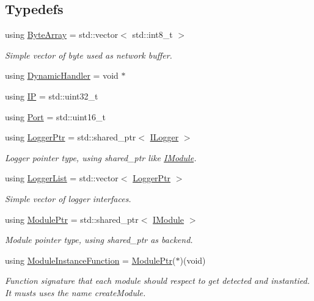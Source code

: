 \subsection*{Typedefs}
\begin{DoxyCompactItemize}
\item 
using \mbox{\hyperlink{namespaceo_z_abfa3f5a46e5c7584615dc1dd33fcafb6}{Byte\+Array}} = std\+::vector$<$ std\+::int8\+\_\+t $>$
\begin{DoxyCompactList}\small\item\em Simple vector of byte used as network buffer. \end{DoxyCompactList}\item 
using \mbox{\hyperlink{namespaceo_z_acbfabf71824b5fc6a3beb64e397afc19}{Dynamic\+Handler}} = void $\ast$
\item 
using \mbox{\hyperlink{namespaceo_z_ace55c2d0182a14ceea9649d0d0cf9c4a}{IP}} = std\+::uint32\+\_\+t
\item 
using \mbox{\hyperlink{namespaceo_z_afeccb82d451972ba3b7d2a32b066b30b}{Port}} = std\+::uint16\+\_\+t
\item 
using \mbox{\hyperlink{namespaceo_z_aaa2fbabbfafc6616a7e69651b62a3d4e}{Logger\+Ptr}} = std\+::shared\+\_\+ptr$<$ \mbox{\hyperlink{classo_z_1_1_i_logger}{I\+Logger}} $>$
\begin{DoxyCompactList}\small\item\em Logger pointer type, using shared\+\_\+ptr like \mbox{\hyperlink{classo_z_1_1_i_module}{I\+Module}}. \end{DoxyCompactList}\item 
using \mbox{\hyperlink{namespaceo_z_a2d18a70272709242e8e7ebffc3f1806c}{Logger\+List}} = std\+::vector$<$ \mbox{\hyperlink{namespaceo_z_aaa2fbabbfafc6616a7e69651b62a3d4e}{Logger\+Ptr}} $>$
\begin{DoxyCompactList}\small\item\em Simple vector of logger interfaces. \end{DoxyCompactList}\item 
using \mbox{\hyperlink{namespaceo_z_af5a56aaaee027504979038f38991adcf}{Module\+Ptr}} = std\+::shared\+\_\+ptr$<$ \mbox{\hyperlink{classo_z_1_1_i_module}{I\+Module}} $>$
\begin{DoxyCompactList}\small\item\em Module pointer type, using shared\+\_\+ptr as backend. \end{DoxyCompactList}\item 
using \mbox{\hyperlink{namespaceo_z_ac1fa0fdab4bd08a5e127651d1f4150a2}{Module\+Instance\+Function}} = \mbox{\hyperlink{namespaceo_z_af5a56aaaee027504979038f38991adcf}{Module\+Ptr}}($\ast$)(void)
\begin{DoxyCompactList}\small\item\em Function signature that each module should respect to get detected and instantied. It musts uses the name \textquotesingle{}create\+Module\textquotesingle{}. \end{DoxyCompactList}\end{DoxyCompactItemize}
